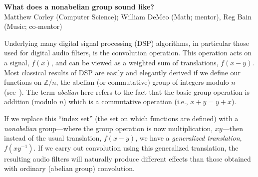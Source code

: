 \documentclass[10pt]{article}
\begin{document}
\begin{center}
{\bf What does a nonabelian group sound like?}\\
Matthew Corley (Computer Science); William DeMeo (Math; mentor), Reg
Bain (Music; co-mentor)
\end{center}

Underlying many digital signal processing (DSP) algorithms, in particular those
used for digital audio filters, is the convolution operation.  This operation
acts on a signal, $f(x)$, and can be viewed as a weighted sum of translations,
$f(x-y)$. Most classical results of DSP are easily and elegantly derived if we
define our functions on $\mathbb{Z}/n$, the abelian (or commutative) group of
integers modulo $n$ (see~\cite{Tolimieri:1998}).
  The term \emph{abelian} here refers to the fact that the basic
group operation is addition (modulo $n$) which is a commutative operation (i.e.,
$x+y = y+x$).

If we replace this ``index set'' (the set on which functions are defined) with a
\emph{nonabelian} group---where the group operation is now multiplication,
$xy$---then instead of the usual translation, $f(x-y)$, we have a
\emph{generalized translation}, $f(xy^{-1})$. 
If we carry out convolution using this generalized translation, the
resulting audio filters will naturally produce different effects than those
obtained with ordinary (abelian group) convolution.  
\end{document}
